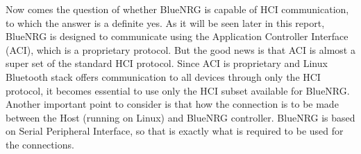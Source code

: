 Now comes the question of whether BlueNRG is capable of HCI communication, to which the answer is a definite yes. As it will be seen later in this report, BlueNRG is designed to communicate using the Application Controller Interface (ACI), which is a proprietary protocol. But the good news is that ACI is almost a super set of the standard HCI protocol. Since ACI is proprietary and Linux Bluetooth stack offers communication to all devices through only the HCI protocol, it becomes essential to use only the HCI subset available for BlueNRG. Another important point to consider is that how the connection is to be made between the Host (running on Linux) and BlueNRG controller. BlueNRG is based on Serial Peripheral Interface, so that is exactly what is required to be used for the connections. 
